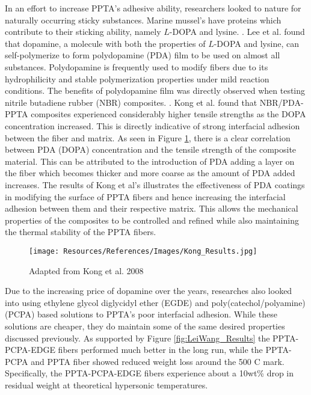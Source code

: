 \documentclass[12pt]{article}
\begin{document}
\begin{multicols}{2}
\indent In an effort to increase PPTA's adhesive ability, researchers looked to nature for naturally occurring sticky substances. Marine mussel's have proteins which contribute to their sticking ability, namely $L$-DOPA and lysine. \citep{Waite2001}. Lee et al. \citep{Lee2007} found that dopamine, a molecule with both the properties of $L$-DOPA and lysine, can self-polymerize to form polydopamine (PDA) film to be used on almost all substances. \citep{Yuan2017} Polydopamine is frequently used to modify fibers due to its hydrophilicity and stable polymerization properties under mild reaction conditions. The benefits of polydopamine film was directly observed when testing nitrile butadiene rubber (NBR) composites. \citep{Kong2018}. Kong et al. \citep{Kong2018} found that NBR/PDA-PPTA composites experienced considerably higher tensile strengths as the DOPA concentration increased. This is directly indicative of strong interfacial adhesion between the fiber and matrix. As seen in Figure \ref{fig:Kong_Results}, there is a clear correlation between PDA (DOPA) concentration and the tensile strength of the composite material. This can be attributed to the introduction of PDA adding a layer on the fiber which becomes thicker and more coarse as the amount of PDA added increases. The results of Kong et al's \citep{Kong2018} illustrates the effectiveness of PDA coatings in modifying the surface of PPTA fibers and hence increasing the interfacial adhesion between them and their respective matrix. This allows the mechanical properties of the composites to be controlled and refined while also maintaining the thermal stability of the PPTA fibers. 

\begin{figure}[H]
    \centering
    \texttt{[image: Resources/References/Images/Kong\_Results.jpg]}
    \caption{\scriptsize{Adapted from Kong et al. 2008 \citep{Kong2018}}}
    \label{fig:Kong_Results}
\end{figure}

\indent Due to the increasing price of dopamine over the years, researches also looked into using ethylene glycol diglycidyl ether (EGDE) and poly(catechol/polyamine) (PCPA) based solutions to PPTA's poor interfacial adhesion. \citep{LeiWang2017} While these solutions are cheaper, they do maintain some of the same desired properties discussed previously. As supported by Figure \ref{fig:LeiWang_Results} the PPTA-PCPA-EDGE fibers performed much better in the long run, while the PPTA-PCPA and PPTA fiber showed reduced weight loss around the 500 \degree C mark. Specifically, the PPTA-PCPA-EDGE fibers experience about a 10wt\% drop in residual weight at theoretical hypersonic temperatures.


\end{multicols}
\end{document}
